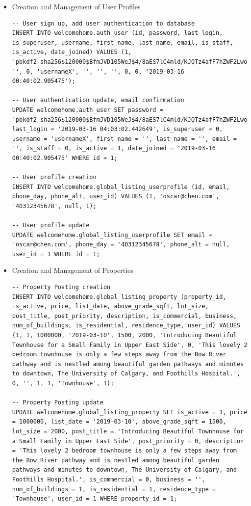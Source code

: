 \documentclass[12pt,a4paper]{report}
\begin{document}
\begin{itemize}
\item Creation and Management of User Profiles
\begin{center}
\begin{lstlisting}
-- User sign up, add user authentication to database
INSERT INTO welcomehome.auth_user (id, password, last_login, is_superuser, username, first_name, last_name, email, is_staff, is_active, date_joined) VALUES (1, 'pbkdf2_sha256$120000$BfmJVD105WeJ$4/8aES7lC4mld/KJQTz4afF7hZWF2LwobueDL6HpgoA=', '', 0, 'usernameX', '', '', '', 0, 0, '2019-03-16 00:40:02.905475');

-- User authentication update, email confirmation
UPDATE welcomehome.auth_user SET password = 'pbkdf2_sha256$120000$BfmJVD105WeJ$4/8aES7lC4mld/KJQTz4afF7hZWF2LwobueDL6HpgoA=', last_login = '2019-03-16 04:03:02.442649', is_superuser = 0, username = 'usernameX', first_name = '', last_name = '', email = '', is_staff = 0, is_active = 1, date_joined = '2019-03-16 00:40:02.905475' WHERE id = 1;

-- User profile creation
INSERT INTO welcomehome.global_listing_userprofile (id, email, phone_day, phone_alt, user_id) VALUES (1, 'oscar@chen.com', '40312345678', null, 1);

-- User profile update
UPDATE welcomehome.global_listing_userprofile SET email = 'oscar@chen.com', phone_day = '40312345678', phone_alt = null, user_id = 1 WHERE id = 1;

\end{lstlisting}
\end{center}

\item Creation and Management of Properties
\begin{center}
\begin{lstlisting}
-- Property Posting creation
INSERT INTO welcomehome.global_listing_property (property_id, is_active, price, list_date, above_grade_sqft, lot_size, post_title, post_priority, description, is_commercial, business, num_of_buildings, is_residential, residence_type, user_id) VALUES (1, 1, 1000000, '2019-03-10', 1500, 2000, 'Introducing Beautiful Townhouse for a Small Family in Upper East Side', 0, 'This lovely 2 bedroom townhouse is only a few steps away from the Bow River pathway and is nestled among beautiful garden pathways and minutes to downtown, The University of Calgary, and Foothills Hospital.', 0, '', 1, 1, 'Townhouse', 1);

-- Property Posting update
UPDATE welcomehome.global_listing_property SET is_active = 1, price = 1000000, list_date = '2019-03-10', above_grade_sqft = 1500, lot_size = 2000, post_title = 'Introducing Beautiful Townhouse for a Small Family in Upper East Side', post_priority = 0, description = 'This lovely 2 bedroom townhouse is only a few steps away from the Bow River pathway and is nestled among beautiful garden pathways and minutes to downtown, The University of Calgary, and Foothills Hospital.', is_commercial = 0, business = '', num_of_buildings = 1, is_residential = 1, residence_type = 'Townhouse', user_id = 1 WHERE property_id = 1;


\end{lstlisting}
\end{center}
\end{itemize}
\end{document}
